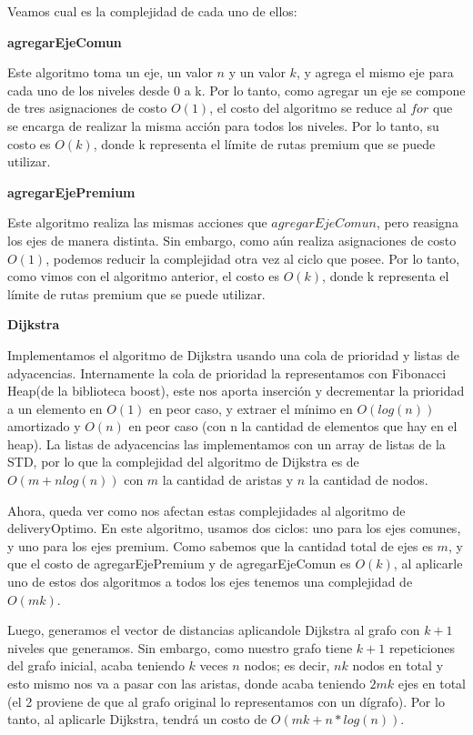 Veamos cual es la complejidad de cada uno de ellos:

\begin{center}
	\textbf{agregarEjeComun}
\end{center}

Este algoritmo toma un eje, un valor $n$ y un valor $k$, y agrega el mismo eje para cada uno de los niveles desde 0 a k. Por lo tanto, como agregar un eje se compone de tres asignaciones de costo $O(1)$, el costo del algoritmo se reduce al $for$ que se encarga de realizar la misma acción para todos los niveles. Por lo tanto, su costo es $O(k)$, donde k representa el límite de rutas premium que se puede utilizar.

\begin{center}
	\textbf{agregarEjePremium}
\end{center}

Este algoritmo realiza las mismas acciones que $agregarEjeComun$, pero reasigna los ejes de manera distinta. Sin embargo, como aún realiza asignaciones de costo $O(1)$, podemos reducir la complejidad otra vez al ciclo que posee. Por lo tanto, como vimos con el algoritmo anterior, el costo es $O(k)$, donde k representa el límite de rutas premium que se puede utilizar.

\begin{center}
	\textbf{Dijkstra}
\end{center}

Implementamos el algoritmo de Dijkstra usando una cola de prioridad y listas de adyacencias. Internamente la cola de prioridad la representamos con Fibonacci Heap(de la biblioteca boost), este nos aporta inserción y decrementar la prioridad a un elemento en $O(1)$ en peor caso, y extraer el mínimo en $O(log(n))$ amortizado y $O(n)$ en peor caso (con n la cantidad de elementos que hay en el heap). La listas de adyacencias las implementamos con un array de listas de la STD, por lo que la complejidad del algoritmo de Dijkstra es de $O(m + n log(n))$ con $m$ la cantidad de aristas y $n$ la cantidad de nodos.\bigskip

Ahora, queda ver como nos afectan estas complejidades al algoritmo de deliveryOptimo. En este algoritmo, usamos dos ciclos: uno para los ejes comunes, y uno para los ejes premium. Como sabemos que la cantidad total de ejes es $m$, y que el costo de agregarEjePremium y de agregarEjeComun es $O(k)$, al aplicarle uno de estos dos algoritmos a todos los ejes tenemos una complejidad de $O(mk)$.

Luego, generamos el vector de distancias aplicandole Dijkstra al grafo con $k+1$ niveles que generamos. Sin embargo, como nuestro grafo tiene $k+1$ repeticiones del grafo inicial, acaba teniendo $k$ veces $n$ nodos; es decir, $nk$ nodos en total y esto mismo nos va a pasar con las aristas, donde acaba teniendo $2mk$ ejes en total (el 2 proviene de que al grafo original lo representamos con un dígrafo). Por lo tanto, al aplicarle Dijkstra, tendrá un costo de $O(mk + n * log(n))$.

